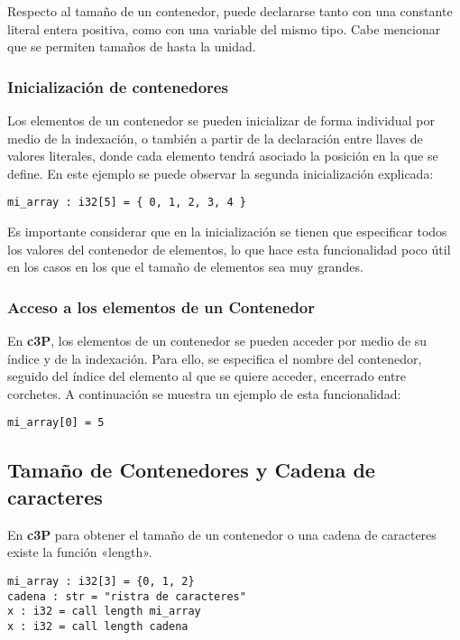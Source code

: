 Respecto al tamaño de un contenedor, puede declararse tanto con una constante literal
entera positiva, como con una variable del mismo tipo. Cabe mencionar que se permiten
tamaños de hasta la unidad.

\subsubsection{Inicialización de contenedores}

Los elementos de un contenedor se pueden inicializar de forma individual por medio de
la indexación, o también a partir de la declaración entre llaves de valores literales,
donde cada elemento tendrá asociado la posición en la que se define. En este ejemplo
se puede observar la segunda inicialización explicada:

\begin{verbatim}
mi_array : i32[5] = { 0, 1, 2, 3, 4 }
\end{verbatim}

Es importante considerar que en la inicialización se tienen que especificar todos los
valores del contenedor de elementos, lo que hace esta funcionalidad poco útil en
los casos en los que el tamaño de elementos sea muy grandes.

\subsubsection{Acceso a los elementos de un Contenedor}

En \textbf{c3P}, los elementos de un contenedor se pueden acceder por medio de su índice y
de la indexación. Para ello, se especifica el nombre del contenedor, seguido del índice del
elemento al que se quiere acceder, encerrado entre corchetes. A continuación se muestra un
ejemplo de esta funcionalidad:

\begin{verbatim}
mi_array[0] = 5
\end{verbatim}

\subsection{Tamaño de Contenedores y Cadena de caracteres}

En \textbf{c3P} para obtener el tamaño de un contenedor o una cadena de caracteres existe la función «length».

\begin{verbatim}
mi_array : i32[3] = {0, 1, 2}
cadena : str = "ristra de caracteres"
x : i32 = call length mi_array
x : i32 = call length cadena
\end{verbatim}